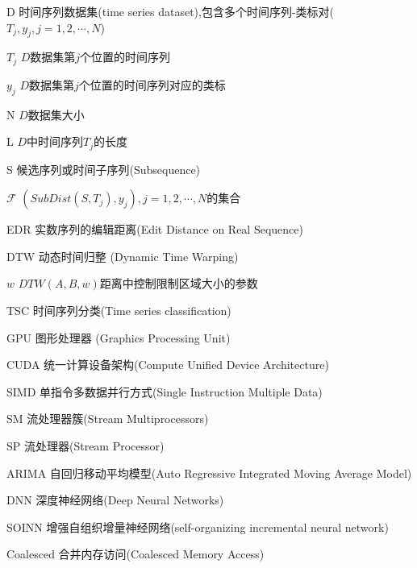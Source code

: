 \begin{denotation}[3cm]
\item[D] 时间序列数据集(time series dataset),包含多个时间序列-类标对($T_j,y_j,j=1,2,\cdots,N$)
\item[$T_j$] $D$数据集第$j$个位置的时间序列
\item[$y_j$] $D$数据集第$j$个位置的时间序列对应的类标
\item[N] $D$数据集大小
\item[L] $D$中时间序列$T_j$的长度
\item[S] 候选序列或时间子序列(Subsequence)
\item[$\mathcal{F}$] $(SubDist(S,T_j),y_j),j=1,2,\cdots,N$的集合
\item[EDR] 实数序列的编辑距离(Edit Distance on Real Sequence)
\item[DTW] 动态时间归整 (Dynamic Time Warping)
\item[$w$] $DTW(A,B,w)$距离中控制限制区域大小的参数
\item[TSC] 时间序列分类(Time series classification)
\item[GPU] 图形处理器 (Graphics Processing Unit)
\item[CUDA] 统一计算设备架构(Compute Unified Device Architecture)
\item[SIMD] 单指令多数据并行方式(Single Instruction Multiple Data)
\item[SM] 流处理器簇(Stream Multiprocessors)
\item[SP] 流处理器(Stream Processor)
\item[ARIMA] 自回归移动平均模型(Auto Regressive Integrated Moving Average Model)
\item[DNN] 深度神经网络(Deep Neural Networks)
\item[SOINN] 增强自组织增量神经网络(self-organizing incremental neural network)
\item[Coalesced] 合并内存访问(Coalesced Memory Access)


\end{denotation}
